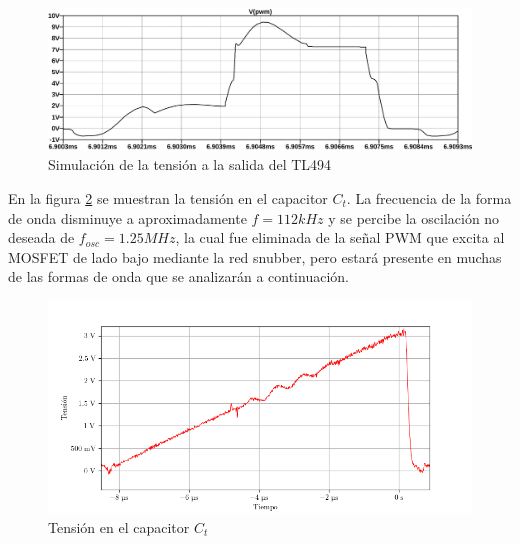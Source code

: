 \begin{figure}[H]
    \centering
    \includegraphics[width=\textwidth]{images/sim/3.pdf}
    \caption{Simulación de la tensión a la salida del TL494}
    \label{fig:sim:osc_pwm_vout}
\end{figure}

En la figura \ref{fig:ct_v} se muestran la tensión en el capacitor $C_t$.
La frecuencia de la forma de onda disminuye a aproximadamente $f=112kHz$ y se percibe la oscilación no deseada de $f_{osc}=1.25MHz$, 
la cual fue eliminada de la señal PWM que excita al MOSFET de lado bajo mediante la red snubber, pero estará presente en muchas de las formas de onda que se analizarán a continuación. 

\begin{figure}[H]
    \centering
    \includegraphics[width=\textwidth]{images/capturas-osciloscopio/17-11-2022/5.png}
    \caption{Tensión en el capacitor $C_t$} %
    \label{fig:ct_v}
\end{figure}



